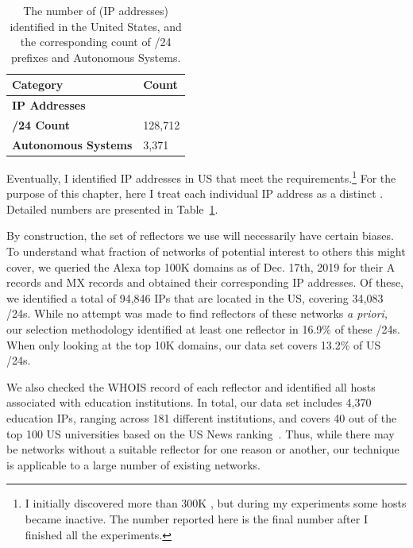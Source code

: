 \begin{table}[t]
\centering
\caption{The number of {} (IP addresses) identified in the United States, and the
corresponding count of /24 prefixes and Autonomous Systems.}
\begin{tabular}{l >{\hfill}p{4.5cm}}
 \toprule
 Category                    &  Count    \\
 \midrule
 \textbf{IP Addresses}       &    \\
 \textbf{/24 Count}          &  128,712  \\
 \textbf{Autonomous Systems} &  3,371    \\
 \bottomrule
\end{tabular}
\label{tab:target-hosts}
\end{table}


Eventually, I identified {} IP addresses in US that meet the
requirements.\footnote{I initially discovered more than 300K {}, 
but during my experiments some hosts became inactive. The number reported 
here is the final number after I finished all the experiments.} For the 
purpose of this chapter, here I treat each individual IP address as a 
distinct {}. Detailed numbers are presented in
Table~\ref{tab:target-hosts}.

By construction, the set of reflectors we use will necessarily
have certain biases. To understand what fraction of networks
of potential interest to others this might cover, we queried
the Alexa top 100K domains as of Dec. 17th, 2019 for their
A records and MX records and obtained their corresponding
IP addresses. Of these, we identified a total of 94,846 IPs
that are located in the US, covering 34,083 /24s. While no
attempt was made to find reflectors of these networks \textit{a priori},
our selection methodology identified at least one reflector
in 16.9\% of these /24s. When only looking at the top 10K
domains, our data set covers 13.2\% of US /24s.

We also checked the WHOIS record of each reflector and
identified all hosts associated with education institutions. In
total, our data set includes 4,370 education IPs, ranging across
181 different institutions, and covers 40 out of the top 100
US universities based on the US News ranking~\cite{usnewsranking}. 
Thus, while there may be networks without a suitable reflector for
one reason or another, our technique is applicable to a large
number of existing networks.


